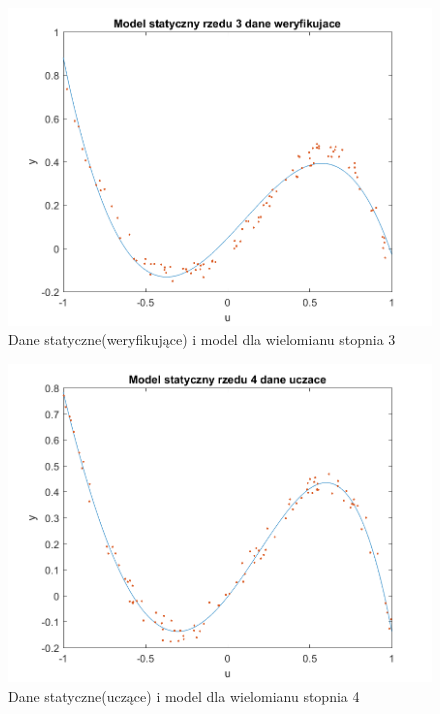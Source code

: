 \documentclass{article}
\begin{document}
\begin{figure}
\centering
\includegraphics[width=0.95\linewidth]{../dane_statyczne/dane_statyczne_model_rzedu_3_weryf}
\caption{Dane statyczne(weryfikujące) i model dla wielomianu stopnia 3}
\label{fig:danestatyczneweryf3}
\end{figure}

\begin{figure}
\centering
\includegraphics[width=0.95\linewidth]{../dane_statyczne/dane_statyczne_model_rzedu_4_uczace}
\caption{Dane statyczne(uczące) i model dla wielomianu stopnia 4}
\label{fig:danestatyczneuczace4}
\end{figure}
\end{document}
